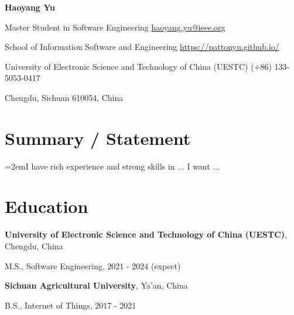 \documentclass{article}
\begin{document}
\begin{center}
    \vspace*{5pt}
    \Huge{
    \textbf{Haoyang Yu}}
\end{center}
\vspace{15pt}




\setlength{\parskip}{1pt}

\noindent Master Student in Software Engineering \hfill \href{mailto:haoyang.yu@ieee.org}{haoyang.yu@ieee.org}

\noindent School of Information Software and Engineering \hfill \url{https://pattonyu.github.io/}

\noindent University of Electronic Science and Technology of China (UESTC) \hfill (+86) 133-5053-0417

\noindent Chengdu, Sichuan 610054, China

\setlength{\parskip}{3pt}




\section*{Summary / Statement}
\indent

\hangindent=2emI have rich experience and strong skills in ... I want ...


\section*{Education}
\indent 

\textbf{University of Electronic Science and Technology of China (UESTC)}, Chengdu, China

\hspace{2em}M.S., Software Engineering, 2021 - 2024 (expect)

\textbf{Sichuan Agricultural University}, Ya'an, China

\hspace{2em}B.S., Internet of Things, 2017 - 2021





\end{document}
